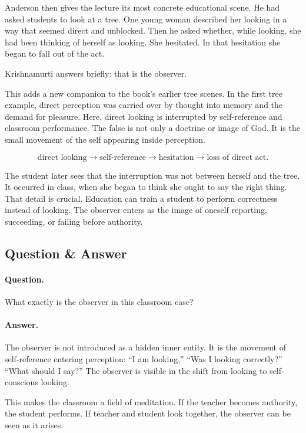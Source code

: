 \documentclass[11pt,oneside]{book}
\begin{document}
Anderson then gives the lecture its most concrete educational scene. He had asked students to look at a tree. One young woman described her looking in a way that seemed direct and unblocked. Then he asked whether, while looking, she had been thinking of herself as looking. She hesitated. In that hesitation she began to fall out of the act.

Krishnamurti answers briefly: that is the observer.

This adds a new companion to the book's earlier tree scenes. In the first tree example, direct perception was carried over by thought into memory and the demand for pleasure. Here, direct looking is interrupted by self-reference and classroom performance. The false is not only a doctrine or image of God. It is the small movement of the self appearing inside perception.

\begin{equation}
\text{direct looking}
\longrightarrow
\text{self-reference}
\longrightarrow
\text{hesitation}
\longrightarrow
\text{loss of direct act}.
\end{equation}

The student later sees that the interruption was not between herself and the tree. It occurred in class, when she began to think she ought to say the right thing. That detail is crucial. Education can train a student to perform correctness instead of looking. The observer enters as the image of oneself reporting, succeeding, or failing before authority.

\subsection{Question \& Answer}

\paragraph{Question.}
What exactly is the observer in this classroom case?

\paragraph{Answer.}
The observer is not introduced as a hidden inner entity. It is the movement of self-reference entering perception: ``I am looking,'' ``Was I looking correctly?'' ``What should I say?'' The observer is visible in the shift from looking to self-conscious looking.

This makes the classroom a field of meditation. If the teacher becomes authority, the student performs. If teacher and student look together, the observer can be seen as it arises.
\end{document}
